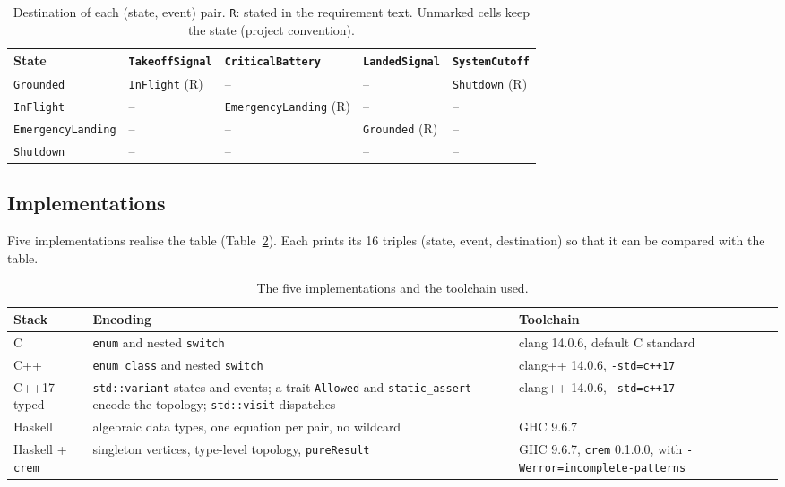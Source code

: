 \documentclass[review,12pt]{elsarticle}
\newcommand{\code}[1]{\texttt{#1}}
\newcommand{\crem}{\texttt{crem}}
\begin{document}
\begin{table}[t]
\caption{Destination of each (state, event) pair. \texttt{R}: stated in the requirement text. Unmarked cells keep the state (project convention).}
\label{tab:delta}
\centering
\scriptsize
\setlength{\tabcolsep}{3pt}
\begin{tabular}{@{}lllll@{}}
\toprule
State & \code{TakeoffSignal} & \code{CriticalBattery} & \code{LandedSignal} & \code{SystemCutoff} \\
\midrule
\code{Grounded}         & \code{InFlight} (R) & -- & -- & \code{Shutdown} (R) \\
\code{InFlight}         & -- & \code{EmergencyLanding} (R) & -- & -- \\
\code{EmergencyLanding} & -- & -- & \code{Grounded} (R) & -- \\
\code{Shutdown}         & -- & -- & -- & -- \\
\bottomrule
\end{tabular}
\end{table}

\subsection{Implementations}

Five implementations realise the table (Table~\ref{tab:stacks}). Each prints its 16 triples (state, event, destination) so that it can be compared with the table.

\begin{table}[t]
\caption{The five implementations and the toolchain used.}
\label{tab:stacks}
\centering
\footnotesize
\begin{tabular}{@{}p{2.1cm}p{4.2cm}p{5.8cm}@{}}
\toprule
Stack & Encoding & Toolchain \\
\midrule
C & \code{enum} and nested \code{switch} & clang 14.0.6, default C standard \\
C++ & \code{enum class} and nested \code{switch} & clang++ 14.0.6, \code{-std=c++17} \\
C++17 typed & \code{std::variant} states and events; a trait \code{Allowed} and \code{static\_assert} encode the topology; \code{std::visit} dispatches & clang++ 14.0.6, \code{-std=c++17} \\
Haskell & algebraic data types, one equation per pair, no wildcard & GHC 9.6.7 \\
Haskell + \crem{} & singleton vertices, type-level topology, \code{pureResult} & GHC 9.6.7, \code{crem} 0.1.0.0, with \code{-Werror=incomplete-patterns} \\
\bottomrule
\end{tabular}
\end{table}
\end{document}
